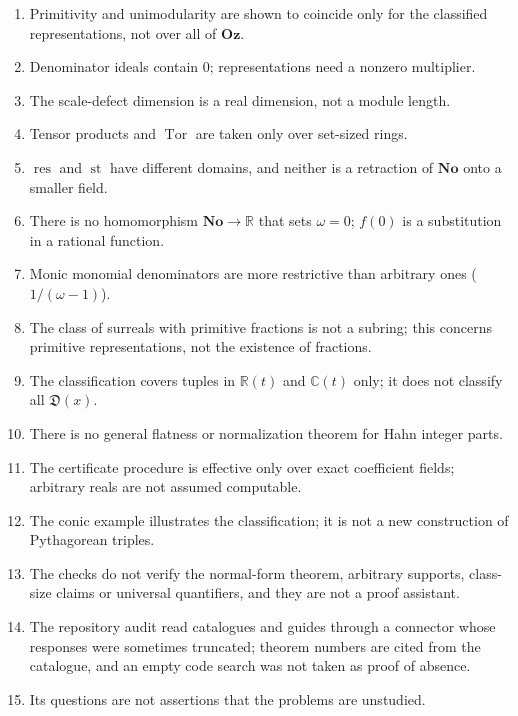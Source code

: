 \documentclass[11pt,oneside]{article}
\numberwithin{equation}{section}
\theoremstyle{definition}
\theoremstyle{remark}
\newcommand{\No}{\mathbf{No}}
\newcommand{\Oz}{\mathbf{Oz}}
\newcommand{\R}{\mathbb R}
\newcommand{\C}{\mathbb C}
\newcommand{\st}{\operatorname{st}}
\newcommand{\Den}{\mathfrak D}
\newcommand{\res}{\operatorname{res}}
\newcommand{\Tor}{\operatorname{Tor}}
\begin{document}
\begin{enumerate}[leftmargin=*,itemsep=1pt]
integer vector before the principal generator is stated.
\item Primitivity and unimodularity are shown to coincide only for the
classified representations, not over all of $\Oz$.
\item Denominator ideals contain $0$; representations need a nonzero
multiplier.
\item The scale-defect dimension is a real dimension, not a module length.
\item Tensor products and $\Tor$ are taken only over set-sized rings.
\item $\res$ and $\st$ have different domains, and neither is a retraction of
$\No$ onto a smaller field.
\item There is no homomorphism $\No\to\R$ that sets $\omega=0$; $f(0)$ is a
substitution in a rational function.
\item Monic monomial denominators are more restrictive than arbitrary ones
($1/(\omega-1)$).
\item The class of surreals with primitive fractions is not a subring; this
concerns primitive representations, not the existence of fractions.
\item The classification covers tuples in $\R(t)$ and $\C(t)$ only; it does
not classify all $\Den(x)$.
\item There is no general flatness or normalization theorem for Hahn integer
parts.
\item The certificate procedure is effective only over exact coefficient
fields; arbitrary reals are not assumed computable.
\item The conic example illustrates the classification; it is not a new
construction of Pythagorean triples.
\item The checks do not verify the normal-form theorem, arbitrary supports,
class-size claims or universal quantifiers, and they are not a proof
assistant.
\item The repository audit read catalogues and guides through a connector whose
responses were sometimes truncated; theorem numbers are cited from the catalogue,
and an empty code search was not taken as proof of absence.
\item Its questions are not assertions that the problems are unstudied.
\end{enumerate}
\end{document}
